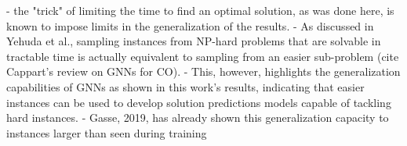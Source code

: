 - the "trick" of limiting the time to find an optimal solution, as was done here, is known to impose limits in the generalization of the results.
- As discussed in Yehuda et al., sampling instances from NP-hard problems that are solvable in tractable time is actually equivalent to sampling from an easier sub-problem (cite Cappart's review on GNNs for CO). 
- This, however, highlights the generalization capabilities of GNNs as shown in this work's results, indicating that easier instances can be used to develop solution predictions models capable of tackling hard instances.
- Gasse, 2019, has already shown this generalization capacity to instances larger than seen during training

